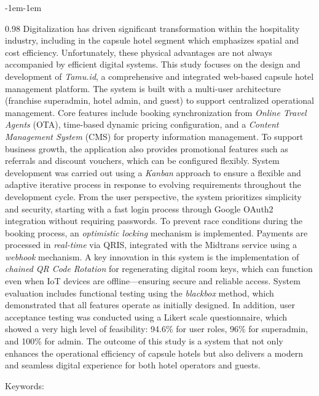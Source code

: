 \begin{adjustwidth}{-1em}{-1em}
\begin{spacing}{0.98}
        Digitalization has driven significant transformation within the hospitality industry, including in the capsule hotel segment which emphasizes spatial and cost efficiency. Unfortunately, these physical advantages are not always accompanied by efficient digital systems. This study focuses on the design and development of \textit{Tamu.id}, a comprehensive and integrated web-based capsule hotel management platform. The system is built with a multi-user architecture (franchise superadmin, hotel admin, and guest) to support centralized operational management. Core features include booking synchronization from \textit{Online Travel Agents} (OTA), time-based dynamic pricing configuration, and a \textit{Content Management System} (CMS) for property information management. To support business growth, the application also provides promotional features such as referrals and discount vouchers, which can be configured flexibly. System development was carried out using a \textit{Kanban} approach to ensure a flexible and adaptive iterative process in response to evolving requirements throughout the development cycle. From the user perspective, the system prioritizes simplicity and security, starting with a fast login process through Google OAuth2 integration without requiring passwords. To prevent race conditions during the booking process, an \textit{optimistic locking} mechanism is implemented. Payments are processed in \textit{real-time} via QRIS, integrated with the Midtrans service using a \textit{webhook} mechanism. A key innovation in this system is the implementation of \textit{chained QR Code Rotation} for regenerating digital room keys, which can function even when IoT devices are offline—ensuring secure and reliable access. System evaluation includes functional testing using the \textit{blackbox} method, which demonstrated that all features operate as initially designed. In addition, user acceptance testing was conducted using a Likert scale questionnaire, which showed a very high level of feasibility: 94.6\% for user roles, 96\% for superadmin, and 100\% for admin. The outcome of this study is a system that not only enhances the operational efficiency of capsule hotels but also delivers a modern and seamless digital experience for both hotel operators and guests.


        \noindent Keywords: \keywords

        \endgroup
    \end{spacing}
\end{adjustwidth}